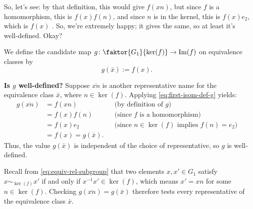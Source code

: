 \begin{proofWrapper}
\begin{speech}[00:06:02 - 00:07:08]
So, let's see: by that definition, this would give $f(xn)$, but since $f$ is a homomorphism, this is $f(x) f(n)$, and since $n$ is in the kernel, this is $f(x) e_2$, which is $f(x)$ . So, we're extremely happy; it gives the same, so at least it's well-defined. Okay?
\end{speech}

\begin{content}
We define the candidate map $g \colon \faktor{G_1}{\ker(f)} \to \operatorname{Im}(f)$ on equivalence classes by
\begin{equation}\label{eq:first-isom-def-g}
g(\bar{x}) := f(x).
\end{equation}

\textbf{Is $g$ well-defined?} Suppose $\overline{xn}$ is another representative name for the equivalence class $\bar{x}$, where $n \in \ker(f)$. Applying \eqref{eq:first-isom-def-g} yields:
\begin{align}
g(\overline{xn}) &= f(xn) && \text{(by definition of $g$)} \nonumber \\
&= f(x) f(n) && \text{(since $f$ is a homomorphism)} \nonumber \\
&= f(x) e_2 && \text{(since $n \in \ker(f)$ implies $f(n) = e_2$)} \nonumber \\
&= f(x) = g(\bar{x}). \label{eq:first-isom-welldef}
\end{align}
Thus, the value $g(\bar{x})$ is independent of the choice of representative, so $g$ is well-defined.

\begin{steps}
Recall from \eqref{eq:equiv-rel-subgroup} that two elements $x, x' \in G_1$ satisfy $x \sim_{\ker(f)} x'$ if and only if $x^{-1} x' \in \ker(f)$, which means $x' = x n$ for some $n \in \ker(f)$. Checking $g(\overline{xn}) = g(\bar{x})$ therefore tests every representative of the equivalence class $\bar{x}$.
\end{steps}
\end{content}

\begin{hidden}
\end{hidden}


\end{proofWrapper}
